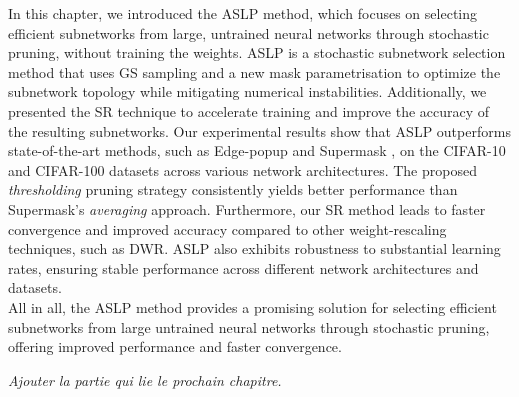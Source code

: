 In this chapter, we introduced the \acl{ASLP} method, which focuses on selecting
efficient subnetworks from large, untrained neural networks through stochastic
pruning, without training the weights. \acl{ASLP} is a stochastic subnetwork selection
method that uses \acl{GS} sampling and a new mask parametrisation to
optimize the subnetwork topology while mitigating numerical instabilities.
Additionally, we presented the \acl{SR} technique to accelerate training and
improve the accuracy of the resulting subnetworks. Our experimental results show
that ASLP outperforms state-of-the-art methods, such as Edge-popup
\cite{DBLP:conf/cvpr/RamanujanWKFR20} and Supermask
\cite{DBLP:conf/nips/ZhouLLY19}, on the CIFAR-10 and CIFAR-100 datasets across
various network architectures. The proposed \textit{thresholding} pruning
strategy consistently yields better performance than Supermask's
\textit{averaging} approach. Furthermore, our \acl{SR} method leads to faster
convergence and improved accuracy compared to other weight-rescaling techniques,
such as \acl{DWR}. \acl{ASLP} also exhibits robustness to substantial learning
rates, ensuring stable performance across different network architectures and
datasets.\\

All in all, the \acl{ASLP} method provides a promising solution for selecting
efficient subnetworks from large untrained neural networks through stochastic
pruning, offering improved performance and faster convergence. 


\textit{Ajouter la partie qui lie le prochain chapitre.}

